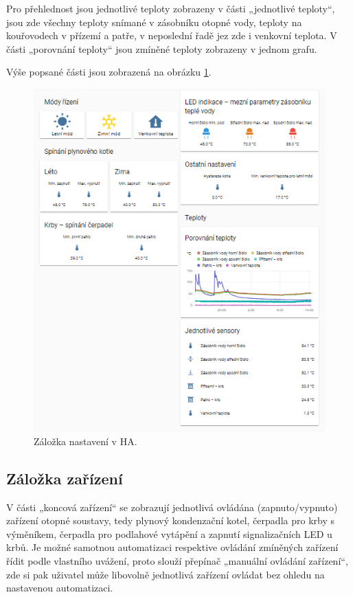 Pro přehlednost jsou jednotlivé teploty zobrazeny v části „jednotlivé teploty“, jsou zde všechny teploty snímané v zásobníku otopné vody, teploty na kouřovodech v přízemí a patře, v neposlední řadě jez zde i venkovní teplota. V části „porovnání teploty“ jsou zmíněné teploty zobrazeny v jednom grafu.

Výše popsané části jsou zobrazená na obrázku \ref{fig:ha-nastaveni}.


\begin{figure}[H]
    \centering
    \includegraphics[width=\textwidth]{images/software-ha/ha-nastaveni.png}
    \caption{Záložka nastavení v HA.}
    \label{fig:ha-nastaveni}
\end{figure}

\subsection{Záložka zařízení}
V části „koncová zařízení“ se zobrazují jednotlivá ovládána (zapnuto/vypnuto) zařízení otopné soustavy, tedy plynový kondenzační kotel, čerpadla pro krby s výměníkem, čerpadla pro podlahové vytápění a zapnutí signalizačních LED u krbů. Je možné samotnou automatizaci respektive ovládání zmíněných zařízení řídit podle vlastního uvážení, proto slouží přepínač „manuální ovládání zařízení“, zde si pak uživatel může libovolně jednotlivá zařízení ovládat bez ohledu na nastavenou automatizaci.

